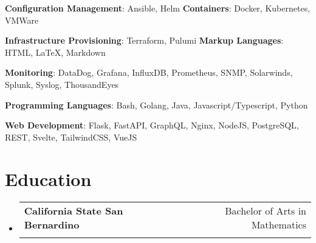 \documentclass[letterpaper,11pt]{article}
\makeatletter
\newcommand{\technicalSkill}[1]{
  \small{#1}
}
\newcommand{\resumeSubheading}[4]{
  \vspace{-1pt}\item
    \begin{tabular*}{0.97\textwidth}[t]{l@{\extracolsep{\fill}}r}
      \textbf{#1} & #2 \\
      \textit{\small#3} & \textit{\small #4} \\
    \end{tabular*}\vspace{-5pt}
}
\newcommand{\resumeSubHeadingListStart}{\begin{itemize}[leftmargin=*]}
\newcommand{\resumeSubHeadingListEnd}{\end{itemize}}
\makeatother
\begin{document}
  \technicalSkill{
    \textbf{Configuration Management}{: Ansible, Helm}
    \hfill
    \textbf{Containers}{: Docker, Kubernetes, VMWare}
  }

  \technicalSkill{
    \textbf{Infrastructure Provisioning}{: Terraform, Pulumi}
    \hfill
    \textbf{Markup Languages}{: HTML, {\LaTeX}, Markdown}
  }

  \technicalSkill{
    \textbf{Monitoring}{: DataDog, Grafana, InfluxDB, Prometheus, SNMP, Solarwinds, Splunk, Syslog, ThousandEyes}
  }

  \technicalSkill{
    \textbf{Programming Languages}{: Bash, Golang, Java, Javascript/Typescript, Python}
  }

  \technicalSkill{
    \textbf{Web Development}{: Flask, FastAPI, GraphQL, Nginx, NodeJS, PostgreSQL, REST, Svelte, TailwindCSS, VueJS}
  }

\section{Education}
  \resumeSubHeadingListStart
    \resumeSubheading
      {California State San Bernardino}{Bachelor of Arts in Mathematics}
      {}{}
  \resumeSubHeadingListEnd

\end{document}
